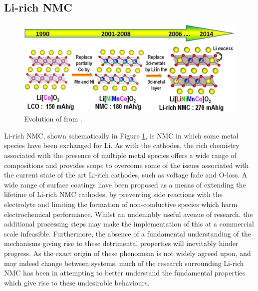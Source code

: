 \subsection{Li-rich NMC}
\begin{figure}
\centering
\includegraphics[width=\linewidth]{figures/structures/tarasconNMC}
\caption{Evolution of  from .\cite{Rozier2015}} 
\label{fig:tarasconNMC}
\end{figure}

Li-rich NMC, shown schematically in Figure \ref{fig:tarasconNMC}, is NMC in which some metal species have been exchanged for Li.
As with the  cathodes, the rich chemistry associated with the presence of multiple metal species offers a wide range of compositions and provides scope to overcome some of the issues associated with the current state of the art Li-rich cathodes, such as voltage fade and O-loss.\cite{Rozier2015}
A wide range of surface coatings \cite{Deng2010,Yang2012,Li2012,Rosina2012,Guan2013,Zhao2011,Shi2013,Wu2006,Zheng2008,Myung2007} have been proposed as a means of extending the lifetime of Li-rich NMC cathodes, by preventing side reactions with the electrolyte and limiting the formation of non-conductive species which harm electrochemical performance.\cite{Rozier2015}
Whilst an undeniably useful avenue of research, the additional processing steps may make the implementation of this at a commercial scale infeasible.
Furthermore, the absence of a fundamental understanding of the mechanisms giving rise to these detrimental properties will inevitably hinder progress.
As the exact origin of these phenomena is not widely agreed upon, and may indeed change between systems, much of the research surrounding Li-rich NMC has been in attempting to better understand the fundamental properties which give rise to these undesirable behaviours.


\newpage
